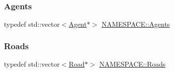 \subsubsection{\texorpdfstring{Agents}{Agents}}
{\footnotesize\ttfamily typedef std\+::vector$<$\hyperlink{class_n_a_m_e_s_p_a_c_e_1_1_agent}{Agent}$\ast$$>$ \hyperlink{namespace_n_a_m_e_s_p_a_c_e_a610552ba0110b3ee573bc9f3a7a8eac4}{N\+A\+M\+E\+S\+P\+A\+C\+E\+::\+Agents}}

\mbox{\label{namespace_n_a_m_e_s_p_a_c_e_a2ec739fb2e81dc98134428bb29817671}} 
\subsubsection{\texorpdfstring{Roads}{Roads}}
{\footnotesize\ttfamily typedef std\+::vector$<$\hyperlink{class_n_a_m_e_s_p_a_c_e_1_1_road}{Road}$\ast$$>$ \hyperlink{namespace_n_a_m_e_s_p_a_c_e_a2ec739fb2e81dc98134428bb29817671}{N\+A\+M\+E\+S\+P\+A\+C\+E\+::\+Roads}}

